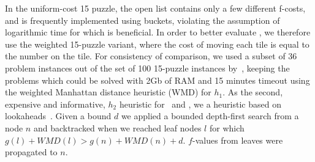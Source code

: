 In the uniform-cost 15 puzzle, the open list contains only a few
different f-costs, and is frequently implemented using buckets,
violating the assumption of logarithmic time for which \rationallazyastar is
beneficial. In order to better evaluate \rationallazyastar, we therefore use
the weighted 15-puzzle variant, where the cost of moving each tile is
equal to the number on the tile.  For consistency of comparison, we
used a subset of 36 problem instances out of the set of 100 15-puzzle
instances by~\cite{BFID85}, keeping the problems which could be solved
with 2Gb of RAM and 15 minutes timeout using the weighted Manhattan
distance heuristic (WMD) for $h_1$. As the second, expensive and informative,
$h_2$ heuristic for \lazyastar~and \rationallazyastar, we a heuristic
based on lookaheads~\cite{DBLP:conf/aaai/SternKFH10}. Given a bound
$d$ we applied a bounded depth-first search from a node $n$ and
backtracked when we reached leaf nodes $l$ for which $g(l)+WMD(l)>
g(n)+WMD(n)+d$. $f$-values from leaves were propagated to $n$.

